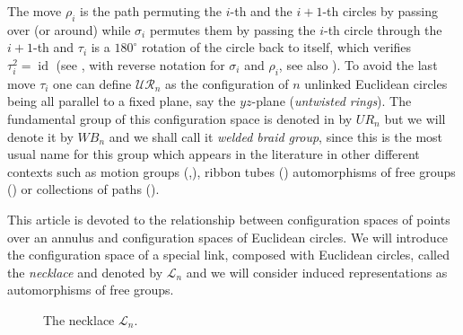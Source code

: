 \documentclass[11pt]{amsart}
\begin{document}
The move $\rho_i$ is the path permuting the $i$-th and the $i+1$-th circles by passing over (or around)
while $\sigma_i$ permutes them by passing the $i$-th circle through the $i+1$-th and $\tau_i$ is a $180^\circ$ rotation of the circle back to itself, 
which verifies $\tau_i^2 = {\mathop{\mathrm{id}}\nolimits}$ (see \cite{BH}, with reverse notation for $\sigma_i$ and $\rho_i$, see also \cite{FS}). 
To avoid the last move $\tau_i$   one can define
$\mathcal{UR}_n$ as the configuration of $n$ unlinked Euclidean circles being all parallel to a fixed plane, say the $yz$-plane
(\emph{untwisted rings}).
The fundamental group of this configuration space is denoted in \cite{BH} by $UR_n$ but we will denote it by $WB_n$
and we shall call it  {\emph{{welded braid group}}}, since this is the most usual name for  this group  which appears in the literature in other  different contexts such as
motion groups (\cite{G1},\cite{G2}), ribbon tubes (\cite{ABMW})
automorphisms of free groups (\cite{BP,FRR}) 
or collections of paths (\cite{FRR}).

\bigskip

This article is devoted to the relationship between   configuration spaces of points 
over an annulus and configuration spaces of Euclidean circles.
We will introduce the configuration space of a special link, composed with Euclidean circles, called the 
{\emph{{necklace}}} and denoted by $\mathcal{L}_n$ and we will consider  induced representations as automorphisms of free groups.
\begin{figure}
 
 
 \caption{The necklace $\mathcal{L}_n$.\label{fig:necklace}}
\end{figure}
\end{document}
